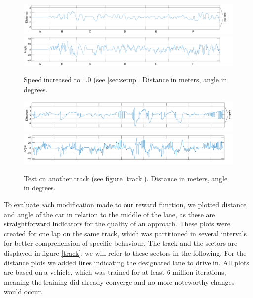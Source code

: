 \begin{figure}[!t]
\centering
\includegraphics[scale=0.265]{../plots/dist_eval_log_smooth_serpentine_10speed}
\vspace{0.5em}
\includegraphics[scale=0.265]{../plots/ang_eval_log_smooth_serpentine_10speed}
\vspace{-2.25em}
\caption{Speed increased to 1.0 (see \ref{sec:setup}. Distance in meters, angle in degrees.}
\label{smooth10}
\vspace{1em}
\includegraphics[scale=0.265]{../plots/dist_eval_log_track_andre_06speed}
\vspace{0.5em}
\includegraphics[scale=0.265]{../plots/ang_eval_log_track_andre_06speed}
\vspace{-2.25em}
\caption{Test on another track (see figure \ref{track}). Distance in meters, angle in degrees.}
\label{andretrack}
\end{figure}

To evaluate each modification made to our reward function, we plotted distance and angle of the car in relation to the middle of the lane, as these are straightforward indicators for the quality of an approach. These plots were created for one lap on the same track, which was partitioned in several intervals for better comprehension of specific behaviour. The track and the sectors are displayed in figure \ref{track}, we will refer to these sectors in the following. For the distance plots we added lines indicating the designated lane to drive in. All plots are based on a vehicle, which was trained for at least 6 million iterations, meaning the training did already converge and no more noteworthy changes would occur. 

